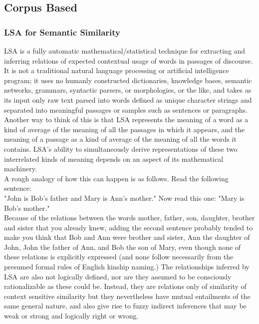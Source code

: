 \subsection{Corpus Based}
\label {corpus}
\subsubsection{LSA for Semantic Similarity}
LSA is a fully automatic mathematical/statistical technique for extracting and inferring relations of expected contextual usage of words in passages of discourse. It is not a traditional natural language processing or artificial intelligence program; it uses no humanly constructed dictionaries, knowledge bases, semantic networks, grammars, syntactic parsers, or morphologies, or the like, and takes as its input only raw text parsed into words defined as unique character strings and separated into meaningful passages or samples such as sentences or paragraphs.
Another way to think of this is that LSA represents the meaning of a word as a kind of average of the meaning of all the passages in which it appears, and the meaning of a passage as a kind of average of the meaning of all the words it contains. LSA's ability to simultaneously derive representations of these two interrelated kinds of meaning depends on an aspect of its mathematical machinery.\\

A rough analogy of how this can happen is as follows. Read the following sentence:\\
"John is Bob's father and Mary is Ann's mother." Now read this one: "Mary is Bob's mother."\\
Because of the relations between the words mother, father, son, daughter, brother and sister that you already knew, adding the second sentence probably tended to make you think that Bob and Ann were brother and sister, Ann the daughter of John, John the father of Ann, and Bob the son of Mary, even though none of these relations is explicitly expressed (and none follow necessarily from the presumed formal rules of English kinship naming.) The relationships inferred by LSA are also not logically defined, nor are they assumed to be consciously rationalizable as these could be. Instead, they are relations only of similarity of context sensitive similarity but they nevertheless have mutual entailments of the same general nature, and also give rise to fuzzy indirect inferences that may be weak or strong and logically right or wrong\citep{lsa}.

